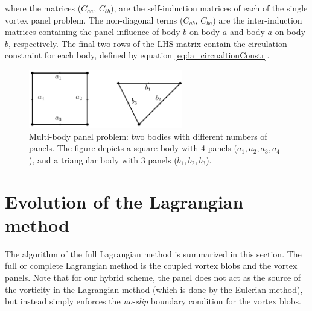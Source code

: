 where the matrices ($C_{aa}$, $C_{bb}$), are the self-induction matrices of each of the single vortex panel problem. The non-diagonal terms ($C_{ab}$, $C_{ba}$) are the inter-induction matrices containing the panel influence of 
body $b$ on body $a$ and body $a$ on body $b$, respectively. The final two rows of the LHS matrix contain the circulation constraint for each body, defined by equation \ref{eq:la_circualtionConstr}.

	\begin{figure}[t]
	\centering
	\includegraphics[width=0.6\textwidth]{figures/lagrangian/twoPanelBodies.pdf}
	\caption{Multi-body panel problem: two bodies with different numbers of panels. The figure depicts a square body with 4 panels ($a_1, a_2, a_3, a_4$), and a triangular body with 3 panels ($b_1, b_2, b_3$). }
	\label{fig:twoPanelBodies}
	\end{figure}




\section{Evolution of the Lagrangian method}

The algorithm of the full Lagrangian method is summarized in this section. The full or complete	Lagrangian method is the coupled vortex blobs and the vortex panels. Note that for our hybrid scheme, the panel does not act as the source of the vorticity in the Lagrangian method (which is done by the Eulerian method), but instead simply enforces the \emph{no-slip} boundary condition for the vortex blobs.
	
